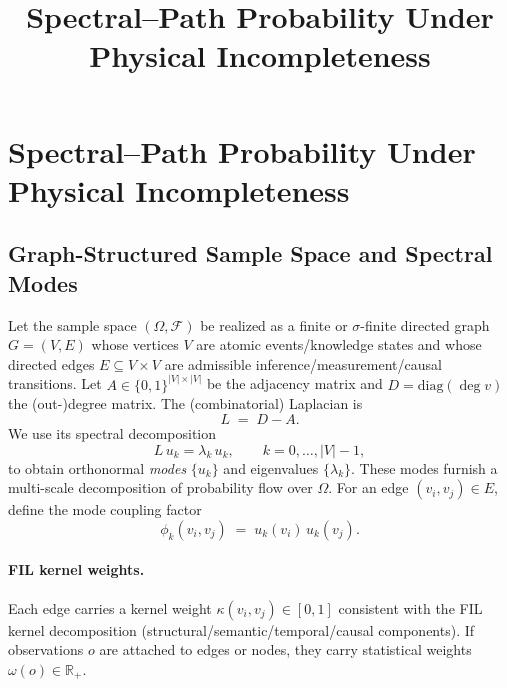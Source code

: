 \documentclass{article}
\title{Spectral–Path Probability Under Physical Incompleteness}
\author{}
\begin{document}
\maketitle

\section{Spectral–Path Probability Under Physical Incompleteness}
\label{sec:spectral-path-prob-PI}
\subsection{Graph-Structured Sample Space and Spectral Modes}
\label{subsec:sample-graph-spectral}
Let the sample space $(\Omega,\mathcal{F})$ be realized as a finite or $\sigma$-finite directed graph
$G=(V,E)$ whose vertices $V$ are atomic events/knowledge states and whose directed edges
$E\subseteq V\times V$ are admissible inference/measurement/causal transitions.
Let $A\in\{0,1\}^{|V|\times|V|}$ be the adjacency matrix and $D=\mathrm{diag}(\deg v)$ the
(out-)degree matrix. The (combinatorial) Laplacian is
\[
L \;=\; D-A.
\]
We use its spectral decomposition
\[
L\,u_k=\lambda_k\,u_k,\qquad k=0,\dots,|V|-1,
\]
to obtain orthonormal \emph{modes} $\{u_k\}$ and eigenvalues $\{\lambda_k\}$. These modes furnish a
multi-scale decomposition of probability flow over $\Omega$.
For an edge $(v_i,v_j)\in E$, define the mode coupling factor
\begin{equation}
\phi_k(v_i,v_j)\;=\;u_k(v_i)\,u_k(v_j).
\label{eq:mode-coupling}
\end{equation}
\paragraph{FIL kernel weights.}
Each edge carries a kernel weight $\kappa(v_i,v_j)\in[0,1]$ consistent with the FIL kernel
decomposition (structural/semantic/temporal/causal components).
If observations $o$ are attached to edges or nodes, they carry statistical weights $\omega(o)\in\mathbb{R}_+$.
\end{document}
